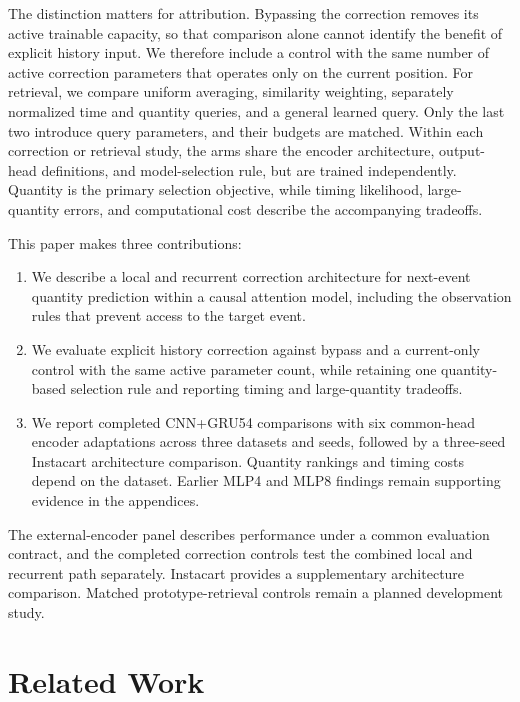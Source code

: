 \documentclass[runningheads]{llncs}
\begin{document}
The distinction matters for attribution. Bypassing the correction removes its active trainable capacity, so that comparison alone cannot identify the benefit of explicit history input. We therefore include a control with the same number of active correction parameters that operates only on the current position. For retrieval, we compare uniform averaging, similarity weighting, separately normalized time and quantity queries, and a general learned query. Only the last two introduce query parameters, and their budgets are matched. Within each correction or retrieval study, the arms share the encoder architecture, output-head definitions, and model-selection rule, but are trained independently. Quantity is the primary selection objective, while timing likelihood, large-quantity errors, and computational cost describe the accompanying tradeoffs.

This paper makes three contributions:
\begin{enumerate}
\item We describe a local and recurrent correction architecture for next-event quantity prediction within a causal attention model, including the observation rules that prevent access to the target event.
\item We evaluate explicit history correction against bypass and a current-only control with the same active parameter count, while retaining one quantity-based selection rule and reporting timing and large-quantity tradeoffs.
\item We report completed CNN+GRU54 comparisons with six common-head encoder adaptations across three datasets and seeds, followed by a three-seed Instacart architecture comparison. Quantity rankings and timing costs depend on the dataset. Earlier MLP4 and MLP8 findings remain supporting evidence in the appendices.
\end{enumerate}
The external-encoder panel describes performance under a common evaluation contract, and the completed correction controls test the combined local and recurrent path separately. Instacart provides a supplementary architecture comparison. Matched prototype-retrieval controls remain a planned development study.

\section{Related Work}
\end{document}
